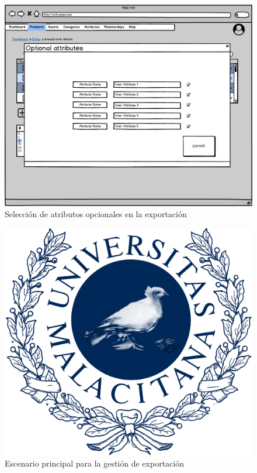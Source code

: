 \begin{figure}[H]
    \includegraphics[width=1\linewidth]{assets/mockups/RF8 Seleccion atributos opcionales.png}
    \caption{Selección de atributos opcionales en la exportación}
\end{figure}

\begin{figure}[H]
    \includegraphics[width=1\linewidth]{assets/umaLogo.png}
    \caption{Escenario principal para la gestión de exportación}
\end{figure}
